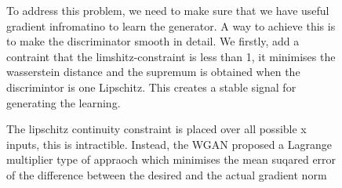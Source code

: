 \documentclass[11pt]{article}
\begin{document}
\begin{figure}[H]
    \centering
    \caption*{To address this problem, we need to make sure that we have useful gradient infromatino to learn the generator. A way to achieve this is to make the discriminator smooth in detail. We firstly, add a contraint that the limshitz-constraint is less than 1, it minimises the wasserstein distance and the supremum is obtained when the discrimintor is one Lipschitz. This creates a stable signal for generating the learning.}
\end{figure}

\begin{figure}[H]
    \centering
    \caption*{The lipschitz continuity constraint is placed over all possible x inputs, this is intractible. Instead, the WGAN proposed a Lagrange multiplier type of appraoch which minimises the mean suqared error of the difference between the desired and the actual gradient norm}
\end{figure}
\end{document}
